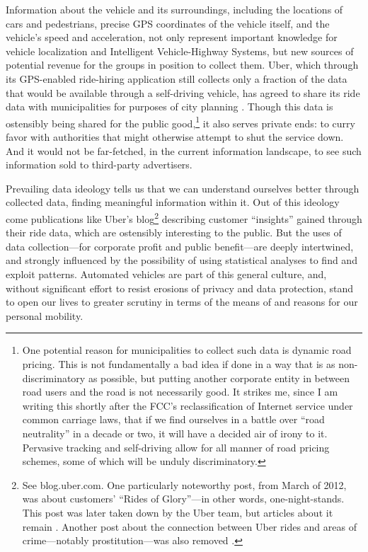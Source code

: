 Information about the vehicle
and its surroundings, including the locations of cars and pedestrians,
precise GPS coordinates of the vehicle itself, and the vehicle's speed
and acceleration, not only represent important knowledge for
vehicle localization and Intelligent Vehicle-Highway Systems, but new sources of potential
revenue for the groups in position to collect them. Uber, which
through its GPS-enabled ride-hiring application still collects only a
fraction of the data that would be available through a self-driving
vehicle, has agreed to share its ride data with municipalities for purposes of
city planning \cite{uberJardin}. Though this data is ostensibly being
shared for the public good,\footnote{One potential reason for municipalities to
  collect such data is dynamic road pricing. This is not fundamentally
a bad idea if done in a way that is as non-discriminatory as possible,
but putting another
corporate entity in between road users and the road is not necessarily
 good. It strikes me, since I am writing this shortly after the
FCC's reclassification of Internet service under common carriage laws,
that if we find ourselves in a battle over ``road neutrality'' in a
decade or two, it will have a decided air of irony to it. Pervasive
tracking and self-driving allow for all manner of road pricing
schemes, some of which will be unduly discriminatory.} it also serves private ends:  to curry favor with
authorities that might otherwise attempt to shut the service down. And it would
not be far-fetched, in the current 
information landscape, to see such information sold to third-party advertisers.

Prevailing data ideology tells us that we can understand ourselves better through
collected data, finding meaningful information within it. Out of this
ideology come publications like Uber's 
blog\footnote{See blog.uber.com. One particularly noteworthy post,
  from March of 2012, was about customers' ``Rides of Glory''---in
  other words, one-night-stands. This post was later taken down by the
Uber team, but articles about it remain \cite{gigaomHarris}. Another
post about the connection between Uber rides and areas of
crime---notably prostitution---was also removed \cite{venturebeatObrien}.} 
describing customer ``insights'' gained through their ride data, which
are ostensibly interesting to the public. But the uses of data collection---for corporate
profit and public benefit---are deeply intertwined, and strongly
influenced by the possibility of using
statistical analyses to find and exploit patterns. Automated vehicles
are part of this general culture, and, without significant effort to
resist erosions of privacy and data protection, stand to open our lives
to greater scrutiny in terms of the means of and reasons for our
personal mobility.


